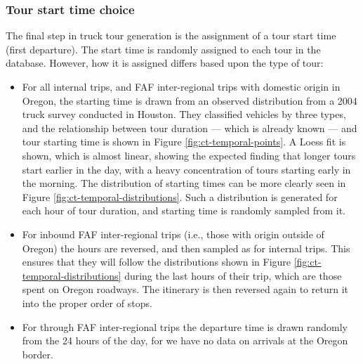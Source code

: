 \subsubsection{Tour start time choice}
The final step in truck tour generation is the assignment of a tour start time (first departure). The start time is randomly assigned to each tour in the database. However, how it is assigned differs based upon the type of tour:
\begin{itemize}
\item For all internal trips, and FAF inter-regional trips with domestic origin in Oregon, the starting time is drawn from an observed distribution from a 2004 truck survey conducted in Houston. They classified vehicles by three types, and the relationship between tour duration --- which is already known --- and tour starting time is shown in Figure \ref{fig:ct-temporal-points}. A Loess fit is shown, which is almost linear, showing the expected finding that longer tours start earlier in the day, with a heavy concentration of tours starting early in the morning. The distribution of starting times can be more clearly seen in Figure \ref{fig:ct-temporal-distributions}. Such a distribution is generated for each hour of tour duration, and starting time is randomly sampled from it. 
\item For inbound FAF inter-regional trips (i.e., those with origin outside of Oregon) the hours are reversed, and then sampled as for internal trips. This ensures that they will follow the distributions shown in Figure \ref{fig:ct-temporal-distributions} during the last hours of their trip, which are those spent on Oregon roadways. The itinerary is then reversed again to return it into the proper order of stops.
\item For through FAF inter-regional trips the departure time is drawn randomly from the 24 hours of the day, for we have no data on arrivals at the Oregon border.
\end{itemize}

